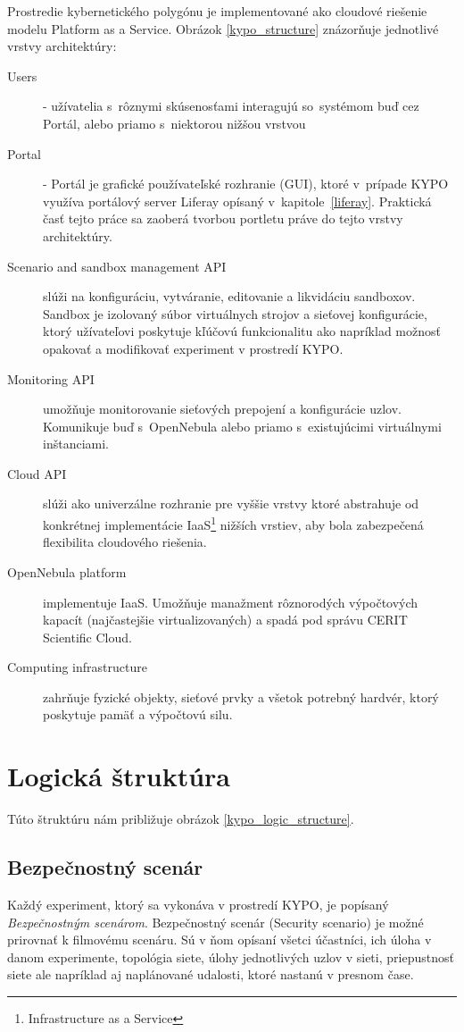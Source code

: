 \documentclass[
  printed, %
  twoside, %
  notable,   %
  nolof,   %
  nolot,   %
]{fithesis3}
\begin{document}
Prostredie kybernetického polygónu je implementované ako cloudové riešenie modelu Platform as a Service. Obrázok \ref{kypo_structure} znázorňuje jednotlivé vrstvy architektúry:

\begin{description}
\item[Users] - užívatelia s~rôznymi skúsenosťami interagujú so~systémom buď cez Portál, alebo priamo s~niektorou nižšou vrstvou
\item[Portal] - Portál je grafické používateľské rozhranie (GUI), ktoré v~prípade KYPO využíva portálový server Liferay opísaný v~kapitole~\ref{liferay}. Praktická časť tejto práce sa zaoberá tvorbou portletu práve do tejto vrstvy architektúry.
\item[Scenario and sandbox management API] slúži na konfiguráciu, vytváranie, editovanie a likvidáciu sandboxov. Sandbox je izolovaný súbor virtuálnych strojov a sieťovej konfigurácie, ktorý užívateľovi poskytuje kľúčovú funkcionalitu ako napríklad možnosť opakovať a modifikovať experiment v prostredí KYPO.
\item[Monitoring API] umožňuje monitorovanie sieťových prepojení a konfigurácie uzlov. Komunikuje buď s~OpenNebula alebo priamo s~existujúcimi virtuálnymi inštanciami.
\item[Cloud API] slúži ako univerzálne rozhranie pre vyššie vrstvy ktoré abstrahuje od konkrétnej implementácie IaaS\footnote{Infrastructure as a Service} nižších vrstiev, aby bola zabezpečená flexibilita cloudového riešenia.
\item[OpenNebula platform] implementuje IaaS\cite{sempolinski2010comparison}. Umožňuje manažment rôznorodých výpočtových kapacít (najčastejšie virtualizovaných) a spadá pod správu CERIT Scientific Cloud.
\item[Computing infrastructure] zahrňuje fyzické objekty, sieťové prvky a všetok potrebný hardvér, ktorý poskytuje pamäť a výpočtovú silu.
\end{description}

\section{Logická štruktúra}
Túto štruktúru nám približuje obrázok \ref{kypo_logic_structure}.

\subsection{Bezpečnostný scenár}
Každý experiment, ktorý sa vykonáva v prostredí KYPO, je popísaný \textit{Bezpečnostným scenárom}. Bezpečnostný scenár (Security scenario) je možné prirovnať k filmovému scenáru. Sú v ňom opísaní všetci účastníci, ich úloha v danom experimente, topológia siete, úlohy jednotlivých uzlov v sieti, priepustnosť siete ale napríklad aj naplánované udalosti, ktoré nastanú v presnom čase\cite{eichler2014analytical, eichler2015kypo}.
\end{document}
